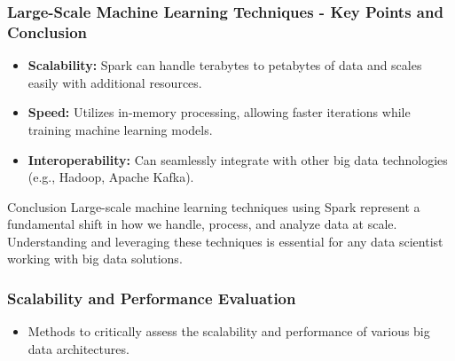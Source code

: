 \documentclass[aspectratio=169]{beamer}
\begin{document}
\begin{frame}[fragile]
    \frametitle{Large-Scale Machine Learning Techniques - Key Points and Conclusion}
    \begin{itemize}
        \item \textbf{Scalability:} 
        Spark can handle terabytes to petabytes of data and scales easily with additional resources.
        
        \item \textbf{Speed:} 
        Utilizes in-memory processing, allowing faster iterations while training machine learning models.
        
        \item \textbf{Interoperability:} 
        Can seamlessly integrate with other big data technologies (e.g., Hadoop, Apache Kafka).
    \end{itemize}
    \begin{block}{Conclusion}
        Large-scale machine learning techniques using Spark represent a fundamental shift in how we handle, process, and analyze data at scale. Understanding and leveraging these techniques is essential for any data scientist working with big data solutions.
    \end{block}
\end{frame}

\begin{frame}[fragile]
    \frametitle{Scalability and Performance Evaluation}
    \begin{itemize}
        \item Methods to critically assess the scalability and performance of various big data architectures.
    \end{itemize}
\end{frame}
\end{document}
